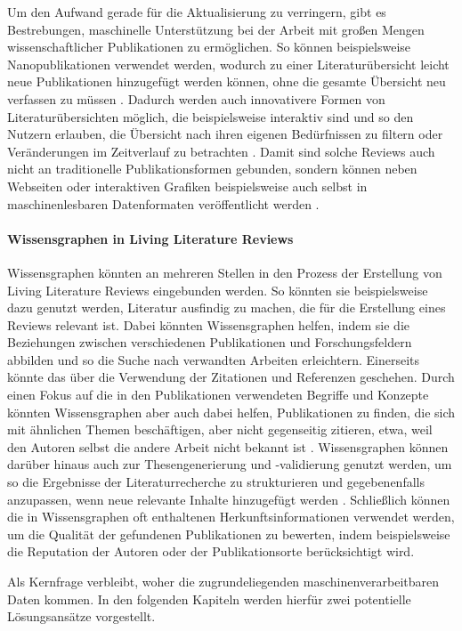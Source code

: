 Um den Aufwand \textemdash gerade für die Aktualisierung \textemdash zu verringern, gibt es Bestrebungen, maschinelle Unterstützung bei der Arbeit mit großen Mengen wissenschaftlicher Publikationen zu ermöglichen.
So können beispielsweise Nanopublikationen \cite{nanopubs} verwendet werden, wodurch zu einer Literaturübersicht leicht neue Publikationen hinzugefügt werden können, ohne die gesamte Übersicht neu verfassen zu müssen \cite{living-lit-review}.
Dadurch werden auch innovativere Formen von Literaturübersichten möglich, die beispielsweise interaktiv sind und so den Nutzern erlauben, die Übersicht nach ihren eigenen Bedürfnissen zu filtern oder Veränderungen im Zeitverlauf zu betrachten \cite{living-lit-review}.
Damit sind solche Reviews auch nicht an traditionelle Publikationsformen gebunden, sondern können neben Webseiten oder interaktiven Grafiken beispielsweise auch selbst in maschinenlesbaren Datenformaten veröffentlicht werden \cite{linked-lit-review}.


\paragraph{Wissensgraphen in Living Literature Reviews}

Wissensgraphen könnten an mehreren Stellen in den Prozess der Erstellung von Living Literature Reviews eingebunden werden.
So könnten sie beispielsweise dazu genutzt werden, Literatur ausfindig zu machen, die für die Erstellung eines Reviews relevant ist.
Dabei könnten Wissensgraphen helfen, indem sie die Beziehungen zwischen verschiedenen Publikationen und Forschungsfeldern abbilden und so die Suche nach verwandten Arbeiten erleichtern.
Einerseits könnte das über die Verwendung der Zitationen und Referenzen geschehen.
Durch einen Fokus auf die in den Publikationen verwendeten Begriffe und Konzepte könnten Wissensgraphen aber auch dabei helfen, Publikationen zu finden, die sich mit ähnlichen Themen beschäftigen, aber nicht gegenseitig zitieren, etwa, weil den Autoren selbst die andere Arbeit nicht bekannt ist \cite{citation-recommendation}.
Wissensgraphen können darüber hinaus auch zur Thesengenerierung und -validierung genutzt werden, um so die Ergebnisse der Literaturrecherche zu strukturieren und gegebenenfalls anzupassen, wenn neue relevante Inhalte hinzugefügt werden \cite{DESSI2022109945}.
Schließlich können die in Wissensgraphen oft enthaltenen Herkunftsinformationen verwendet werden, um die Qualität der gefundenen Publikationen zu bewerten, indem beispielsweise die Reputation der Autoren oder der Publikationsorte berücksichtigt wird.

Als Kernfrage verbleibt, woher die zugrundeliegenden maschinenverarbeitbaren Daten kommen.
In den folgenden Kapiteln werden hierfür zwei potentielle Lösungsansätze vorgestellt.